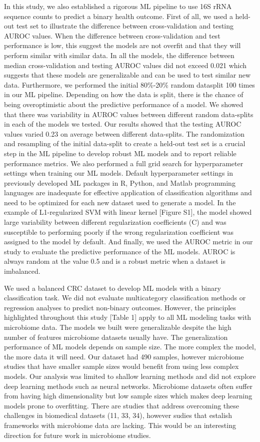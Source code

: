 \documentclass[11pt,]{article}
\begin{document}
In this study, we also established a rigorous ML pipeline to use 16S
rRNA sequence counts to predict a binary health outcome. First of all,
we used a held-out test set to illustrate the difference between
cross-validation and testing AUROC values. When the difference between
cross-validation and test performance is low, this suggest the models
are not overfit and that they will perform similar with similar data. In
all the models, the difference between median cross-validation and
testing AUROC values did not exceed 0.021 which suggests that these
models are generalizable and can be used to test similar new data.
Furthermore, we performed the initial 80\%-20\% random datasplit 100
times in our ML pipeline. Depending on how the data is split, there is
the chance of being overoptimistic about the predictive performance of a
model. We showed that there was variability in AUROC values between
different random data-splits in each of the models we tested. Our
results showed that the testing AUROC values varied 0.23 on average
between different data-splits. The randomization and resampling of the
initial data-split to create a held-out test set is a crucial step in
the ML pipeline to develop robust ML models and to report reliable
performance metrics. We also performed a full grid search for
hyperparameter settings when training our ML models. Default
hyperparameter settings in previously developed ML packages in R,
Python, and Matlab programming languages are inadequate for effective
application of classification algorithms and need to be optimized for
each new dataset used to generate a model. In the example of
L1-regularized SVM with linear kernel {[}Figure S1{]}, the model showed
large variability between different regularization coefficients (C) and
was susceptible to performing poorly if the wrong regularization
coefficient was assigned to the model by default. And finally, we used
the AUROC metric in our study to evaluate the predictive performance of
the ML models. AUROC is always random at the value 0.5 and is a robust
metric when a dataset is imbalanced.

We used a balanced CRC dataset to develop ML models with a binary
classification task. We did not evaluate multicategory classification
methods or regression analyses to predict non-binary outcomes. However,
the principles highlighted throughout this study {[}Table 1{]} apply to
all ML modeling tasks with microbiome data. The models we built were
generalizable despite the high number of features microbiome datasets
usually have. The generalization performance of ML models depends on
sample size. The more complex the model, the more data it will need. Our
dataset had 490 samples, however microbiome studies that have smaller
sample sizes would benefit from using less complex models. Our analysis
was limited to shallow learning methods and did not explore deep
learning methods such as neural networks. Microbiome datasets often
suffer from having high dimensionality but low sample sizes which makes
deep learning models prone to overfitting. There are studies that
address overcoming these challenges in biomedical datasets (11, 33, 34),
however sudies that estalish frameworks with microbiome data are
lacking. This would be an interesting direction for future work in
microbiome studies.
\end{document}
